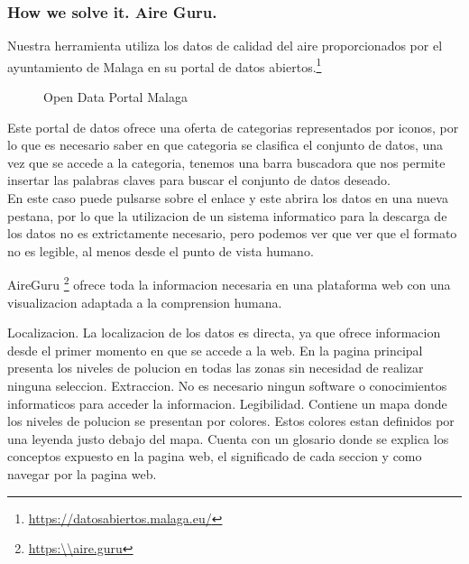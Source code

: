 \subsubsection{How we solve it. Aire Guru.} 

Nuestra herramienta utiliza los datos de calidad del aire proporcionados por el ayuntamiento de Malaga en su portal de datos abiertos.\footnote{\url{https://datosabiertos.malaga.eu/}}\\
\begin{figure}[ht]
    \centering
    \hfill
    \vfill
  
  \caption{Open Data Portal Malaga}
    \end{figure}

    Este portal de datos ofrece una oferta de categorias representados por iconos, por lo que es necesario saber en que categoria se clasifica el conjunto
de datos, una vez que se accede a la categoria, tenemos una barra buscadora que nos permite insertar las palabras claves para buscar el conjunto de datos
deseado.\\

En este caso puede pulsarse sobre el enlace y este abrira los datos en una nueva pestana, por lo que la utilizacion de un sistema informatico
para la descarga de los datos no es extrictamente necesario, pero podemos ver que ver que el formato no es legible, al menos desde el punto
de vista humano. 

AireGuru \footnote{\url{https:\\aire.guru}} ofrece toda la informacion necesaria en una plataforma web con una visualizacion adaptada
a la comprension humana.
\newpage
{}  

\begin{itemize}
    \done Localizacion. La localizacion de los datos es directa, ya que ofrece informacion desde el primer momento en que se accede a la web. En la pagina principal
    presenta los niveles de polucion en todas las zonas sin necesidad de realizar ninguna seleccion.
    \done Extraccion. No es necesario ningun software o conocimientos informaticos para acceder la informacion.
    \done Legibilidad. Contiene un mapa donde los niveles de polucion se presentan por colores. Estos colores estan definidos por una leyenda justo
    debajo del mapa. Cuenta con un glosario donde se explica los conceptos expuesto en la pagina web, el significado de cada seccion y como
    navegar por la pagina web.
 

\end{itemize}
\newpage

 


